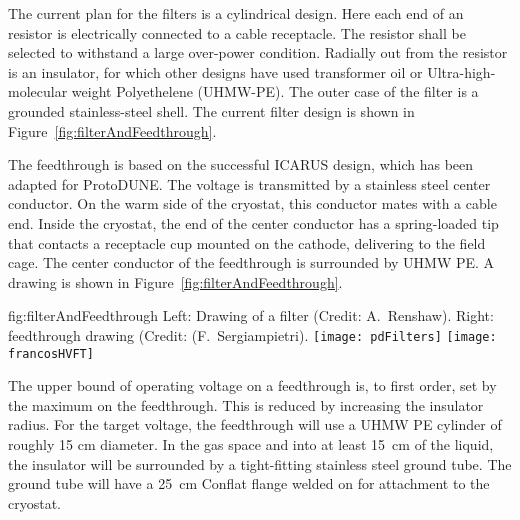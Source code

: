 The current plan for the filters is a cylindrical design.  %
Here each end of an  resistor is electrically connected to a cable receptacle. 
The resistor %
shall be selected to withstand a large over-power condition.  Radially out from the resistor is an insulator,  %
for which other designs have used transformer oil or Ultra-high-molecular weight Polyethelene (UHMW-PE).  The outer case of the filter is a grounded stainless-steel shell. The current filter design is shown in Figure~\ref{fig:filterAndFeedthrough}.

The  feedthrough %
is based on the successful ICARUS design, which has been adapted for ProtoDUNE.  The voltage is transmitted by a stainless steel center conductor.  On the warm side of the cryostat, this conductor mates with a cable end.  Inside the cryostat, the end of the center conductor has a spring-loaded tip that %
contacts a receptacle cup mounted on the cathode, delivering  to the field cage.  The center conductor of the feedthrough is surrounded by UHMW PE. A drawing is shown in Figure~\ref{fig:filterAndFeedthrough}.

\begin{dunefigure}{fig:filterAndFeedthrough}
{Left:  Drawing of a  filter (Credit:  A.~Renshaw). Right:   feedthrough drawing (Credit:  (F.~Sergiampietri).}
\texttt{[image: pdFilters]}
\texttt{[image: francosHVFT]}
\end{dunefigure}

The upper bound of operating voltage on a feedthrough is, to first order, set by the maximum \efield{} on the feedthrough.  This \efield{} is reduced by increasing the insulator radius.  For the target voltage, the feedthrough will use a UHMW PE cylinder of roughly 15 cm diameter.  In the gas space and into at least \SI{15}{\centi\meter} of the liquid, the insulator will be surrounded by a tight-fitting stainless steel ground tube.  The ground tube will have a \SI{25}{\centi\meter}  Conflat flange  welded on for attachment to the cryostat.


